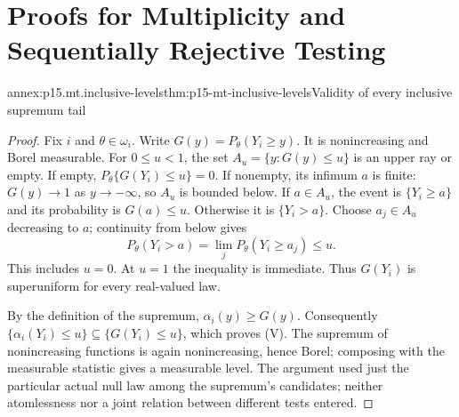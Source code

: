 \section{Proofs for Multiplicity and Sequentially Rejective Testing}
\label{annex:p15-multiple-testing}

\begin{annexitem}{annex:p15.mt.inclusive-levels}{thm:p15-mt-inclusive-levels}{Validity of every inclusive supremum tail}
\begin{proof}
Fix \(i\) and \(\theta\in\omega_i\). Write
\(G(y)=P_\theta(Y_i\geq y)\). It is nonincreasing and Borel measurable.
For \(0\leq u<1\), the set \(A_u=\{y:G(y)\leq u\}\) is an upper ray
or empty. If empty, \(P_\theta\{G(Y_i)\leq u\}=0\).
If nonempty, its infimum \(a\) is finite: \(G(y)\to1\) as
\(y\to-\infty\), so \(A_u\) is bounded below.
If \(a\in A_u\), the event is \(\{Y_i\geq a\}\) and its probability
is \(G(a)\leq u\). Otherwise it is \(\{Y_i>a\}\).
Choose \(a_j\in A_u\) decreasing to \(a\); continuity from below gives
\[
 P_\theta(Y_i>a)=\lim_jP_\theta(Y_i\geq a_j)\leq u.
\]
This includes \(u=0\). At \(u=1\) the inequality is immediate.
Thus \(G(Y_i)\) is superuniform for every real-valued law.

By the definition of the supremum, \(\alpha_i(y)\geq G(y)\).
Consequently \(\{\alpha_i(Y_i)\leq u\}\subseteq\{G(Y_i)\leq u\}\),
which proves (V). The supremum of nonincreasing functions is again
nonincreasing, hence Borel; composing with the measurable statistic
gives a measurable level. The argument used just the particular actual
null law among the supremum's candidates; neither atomlessness nor a
joint relation between different tests entered.
\end{proof}
\end{annexitem}

